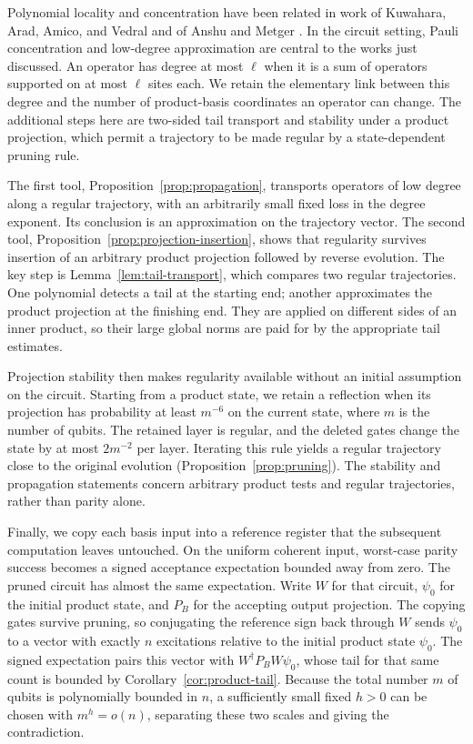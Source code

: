 Polynomial locality and concentration have been related in work of
Kuwahara, Arad, Amico, and Vedral and of Anshu and Metger
\citep{KuwaharaAradAmicoVedral2017,AnshuMetger2023}. In the circuit
setting, Pauli concentration and low-degree approximation are central
to the works just discussed. An operator has degree at most $\ell$ when it is a sum of operators
supported on at most $\ell$ sites each. We retain the elementary link
between this degree and the number of product-basis coordinates an
operator can change. The additional steps here are two-sided tail transport and
stability under a product projection, which permit a trajectory to be
made regular by a state-dependent pruning rule.

The first tool, Proposition~\ref{prop:propagation}, transports
operators of low degree along a regular
trajectory, with an arbitrarily small fixed loss in the degree
exponent. Its conclusion is an approximation on the trajectory
vector. The second tool, Proposition~\ref{prop:projection-insertion},
shows that regularity survives insertion
of an arbitrary product projection followed by reverse evolution.
The key step is Lemma~\ref{lem:tail-transport}, which compares two
regular trajectories. One polynomial detects a tail at the starting end;
another approximates the product projection at the finishing end.
They are applied on different sides of an inner product, so their
large global norms are paid for by the appropriate tail estimates.

Projection stability then makes regularity available without an
initial assumption on the circuit. Starting from a product state,
we retain a reflection when its projection has probability at least
$m^{-6}$ on the current state, where $m$ is the number of qubits.
The retained layer is regular, and the deleted gates change the
state by at most $2m^{-2}$ per layer. Iterating this rule yields a
regular trajectory close to the original evolution
(Proposition~\ref{prop:pruning}). The stability
and propagation statements concern arbitrary product tests and
regular trajectories, rather than parity alone.

Finally, we copy each basis input into a reference register that the
subsequent computation leaves untouched.
On the uniform coherent input, worst-case parity success becomes
a signed acceptance expectation bounded away from zero. The
pruned circuit has almost the same expectation. Write $W$ for that circuit,
$\psi_0$ for the initial product state, and $P_B$ for the accepting output
projection. The copying gates survive pruning, so conjugating the reference
sign back through $W$ sends $\psi_0$
to a vector with exactly $n$ excitations relative to the initial product state
$\psi_0$. The signed expectation pairs this vector with $W^\dagger P_BW\psi_0$,
whose tail for that same count is bounded by
Corollary~\ref{cor:product-tail}. Because the total number $m$ of qubits is polynomially
bounded in $n$, a sufficiently small fixed $h>0$ can be chosen
with $m^h=o(n)$, separating these two scales and giving the contradiction.

